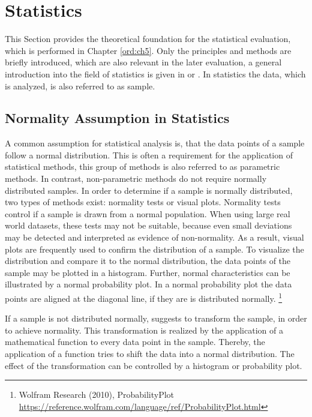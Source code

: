 
\section{Statistics}\label{ord:ch2:sec4}

This Section provides the theoretical foundation for the statistical evaluation, which is performed in Chapter \ref{ord:ch5}.
Only the principles and methods are briefly introduced, which are also relevant in the later evaluation, a general introduction into the field of statistics is given in \cite{PS16-Statistics} or \cite{Dodge08-Statistics}.
In statistics the data, which is analyzed, is also referred to as sample.


\subsection{Normality Assumption in Statistics} \label{ord:ch2:sec4:subsec1}
A common assumption for statistical analysis is, that the data points of a sample follow a normal distribution.
This is often a requirement for the application of statistical methods, this group of methods is also referred to as parametric methods.
In contrast, non-parametric methods do not require normally distributed samples.
In order to determine if a sample is normally distributed, two types of methods exist: normality tests or visual plots.
Normality tests control if a sample is drawn from a normal population.
When using large real world datasets, these tests may not be suitable, because even small deviations may be detected and interpreted as evidence of non-normality.
As a result, visual plots are frequently used to confirm the distribution of a sample.
To visualize the distribution and compare it to the normal distribution, the data points of the sample may be plotted in a histogram.
Further, normal characteristics can be illustrated by a normal probability plot.
In a normal probability plot the data points are aligned at the diagonal line, if they are is distributed normally. \footnote{Wolfram Research (2010), ProbabilityPlot \url{https://reference.wolfram.com/language/ref/ProbabilityPlot.html}}

If a sample is not distributed normally, \cite{PS16-Statistics} suggests to transform the sample, in order to achieve normality.
This transformation is realized by the application of a mathematical function to every data point in the sample.
Thereby, the application of a function tries to shift the data into a normal distribution.
The effect of the transformation can be controlled by a histogram or probability plot.


